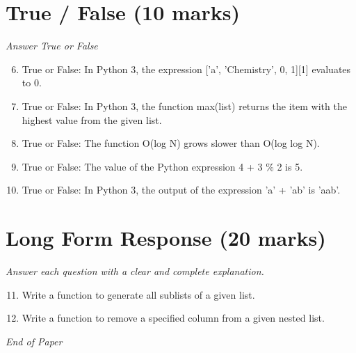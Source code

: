 \documentclass[12pt]{article}
\begin{document}
\section*{True / False (10 marks)}
\textit{Answer True or False}
\begin{enumerate}[label=\arabic*.]
\setcounter{enumi}{5}
\item True or False: In Python 3, the expression ['a', 'Chemistry', 0, 1][1] evaluates to 0.
\item True or False: In Python 3, the function max(list) returns the item with the highest value from the given list.
\item True or False: The function O(log N) grows slower than O(log log N).
\item True or False: The value of the Python expression 4 + 3 \% 2 is 5.
\item True or False: In Python 3, the output of the expression 'a' + 'ab' is 'aab'.
\end{enumerate}

\section*{Long Form Response (20 marks)}
\textit{Answer each question with a clear and complete explanation.}
\begin{enumerate}[label=\arabic*.]
\setcounter{enumi}{10}
\item Write a function to generate all sublists of a given list.
\item Write a function to remove a specified column from a given nested list.
\end{enumerate}

\vfill
\noindent\textit{End of Paper}
\end{document}

